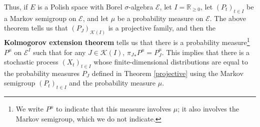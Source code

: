 \documentclass{article}
\theoremstyle{definition}
\begin{document}
Thus, if $E$ is a Polish space with Borel $\sigma$-algebra $\mathscr{E}$,
let $I=\mathbb{R}_{\geq 0}$,
let $(P_t)_{t \in I}$ be a Markov semigroup 
on $\mathscr{E}$, and let $\mu$ be a probability measure on $\mathscr{E}$.
The above theorem tells us that $(P_J)_{\mathscr{K}(I)}$ is a projective family, and then
the \textbf{Kolmogorov extension theorem}
tells us that there is a probability measure\footnote{We write $P^\mu$ to indicate that this measure
involves $\mu$; it also involves the Markov semigroup, which we do not indicate.} $P^\mu$ on $\mathscr{E}^I$ such that 
for any $J \in \mathscr{K}(I)$, ${\pi_J}_* P^\mu = P^\mu_J$. This implies that
there is a stochastic process 
$(X_t)_{t \in I}$ whose finite-dimensional distributions are equal 
to the probability measures $P_J$ defined in Theorem \ref{projective} using the Markov semigroup $(P_t)_{t \in I}$ and the probability
measure $\mu$. 
\end{document}
